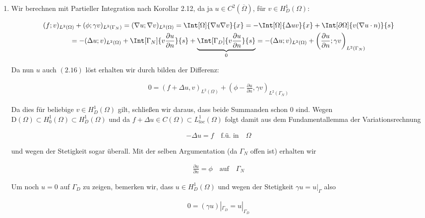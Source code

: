 \begin{solution}
\begin{enumerate}[label = (\roman*)]
    \item Wir berechnen mit Partieller Integration nach Korollar 2.12, da ja $u \in C^2(\overline{\Omega})$, für $v \in H_D^1(\Omega)$:

    \begin{multline*}
      (f;v)_{L^2(\Omega)} + (\phi;\gamma v)_{L^2(\Gamma_N)} = (\nabla u; \nabla v)_{L^2(\Omega)}
      =
      \Int[\Omega]{\nabla u \nabla v}{x}
      =
      -\Int[\Omega]{\Delta u v}{x} + \Int[\partial \Omega]{v(\nabla u \cdot n)}{s} \\
      =
      -(\Delta u; v)_{L^2(\Omega)}
      + \Int[\Gamma_N]{v \frac{\partial u}{\partial n}}{s}
      + \underbrace{\Int[\Gamma_D]{v \frac{\partial u}{\partial n}}{s}}_{0}
      =
      -(\Delta u; v)_{L^2(\Omega)} + \left(\frac{\partial u}{\partial n}; \gamma v\right)_{L^2(\Gamma_N)}
    \end{multline*}

    Da nun $u$ auch $(2.16)$ löst erhalten wir durch bilden der Differenz:

    \begin{align*}
      0 = (f + \Delta u, v)_{L^2(\Omega)} + (\phi - \frac{\partial u}{\partial n}, \gamma v)_{L^2(\Gamma_N)}
    \end{align*}

    Da dies für beliebige $v \in H_D^1(\Omega)$ gilt, schließen wir daraus, dass beide Summanden schon $0$ sind.
    Wegen $\mathrm{D}(\Omega) \subset H^1_0(\Omega) \subset H^1_D(\Omega)$ und da $f + \Delta u \in C(\Omega) \subset L^1_{loc}(\Omega)$ folgt damit aus dem Fundamentallemma der Variationsrechnung

    \begin{align*}
        -\Delta u = f \quad \text {f.ü. in} \quad \Omega
    \end{align*}

    und wegen der Stetigkeit sogar überall.
    Mit der selben Argumentation (da $\Gamma_N$ offen ist) erhalten wir

    \begin{align*}
      \frac{\partial u}{\partial n} = \phi \quad \text{auf} \quad \Gamma_N
    \end{align*}

    Um noch $u = 0$ auf $\Gamma_D$ zu zeigen, bemerken wir, dass $u \in H^1_D(\Omega)$ und wegen der Stetigkeit $\gamma u = u|_{\Gamma}$ also

    \begin{align*}
      0 = (\gamma u)|_{\Gamma_D} = u|_{\Gamma_D}
    \end{align*}
\end{enumerate}

\end{solution}

